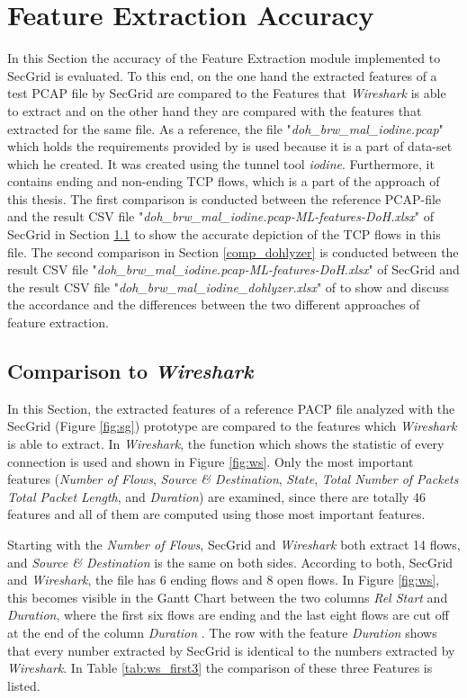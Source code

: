 \section{Feature Extraction Accuracy}
In this Section the accuracy of the Feature Extraction module implemented to SecGrid is evaluated. To this end, on the one hand the extracted features of a test PCAP file by SecGrid are compared to the Features that \textit{Wireshark} is able to extract and on the other hand they are compared with the features that \cite{montazerishatoori2020anomaly} extracted for the same file. As a reference, the file "\textit{doh\_brw\_mal\_iodine.pcap}" which holds the requirements provided by \cite{montazerishatoori2020anomaly} is used because it is a part of data-set \cite{CIRA-CIC-DoHBrw-2020} which he created. It was created using the tunnel tool \textit{iodine}. Furthermore, it contains ending and non-ending TCP flows, which is a part of the approach of this thesis. The first comparison is conducted between the reference PCAP-file and the result CSV file "\textit{doh\_brw\_mal\_iodine.pcap-ML-features-DoH.xlsx}" of SecGrid in Section \ref{comp_ws} to show the accurate depiction of the TCP flows in this file. The second comparison in Section \ref{comp_dohlyzer} is conducted between the result CSV file "\textit{doh\_brw\_mal\_iodine.pcap-ML-features-DoH.xlsx}" of SecGrid and the result CSV file "\textit{doh\_brw\_mal\_iodine\_dohlyzer.xlsx}" of \cite{DoHlyzer} to show and discuss the accordance and the differences between the two different approaches of feature extraction.

\subsection{Comparison to \textit{Wireshark}} \label{comp_ws}
In this Section, the extracted features of a reference PACP file analyzed with the SecGrid (Figure \ref{fig:sg}) prototype are compared to the features which \textit{Wireshark} is able to extract. In \textit{Wireshark}, the function which shows the statistic of every connection is used and shown in Figure \ref{fig:ws}. Only the most important features (\textit{Number of Flows}, \textit{Source \& Destination}, \textit{State}, \textit{Total Number of Packets} \textit{Total Packet Length}, and \textit{Duration}) are examined, since there are totally 46 features and all of them are computed using those most important features. 

Starting with the \textit{Number of Flows}, SecGrid and \textit{Wireshark} both extract 14 flows, and \textit{Source \& Destination} is the same on both sides. According to both, SecGrid and \textit{Wireshark}, the file has 6 ending flows and 8 open flows. In Figure \ref{fig:ws}, this becomes visible in the Gantt Chart between the two columns \textit{Rel Start} and \textit{Duration}, where the first six flows are ending and the last eight flows are cut off at the end of the column \textit{Duration} . The row with the feature \textit{Duration} shows that every number extracted by SecGrid is identical to the numbers extracted by \textit{Wireshark}. In Table \ref{tab:ws_first3} the comparison of these three Features is listed. 


